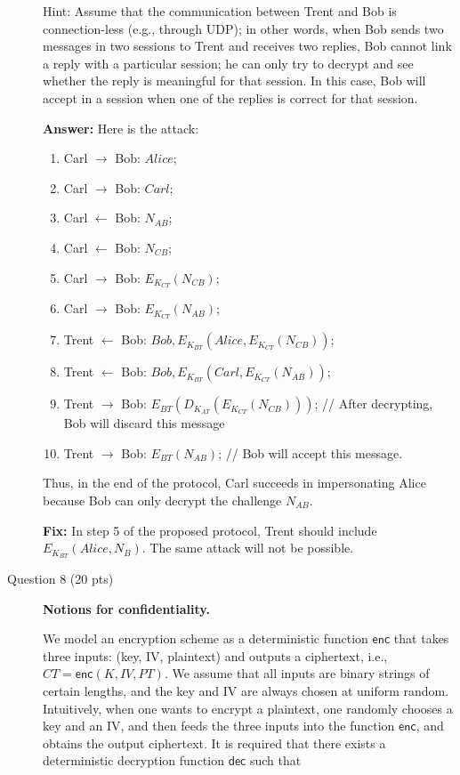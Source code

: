 \documentclass[11pt]{article}
\newcommand{\ans}[1]{\begin{mdframed}\textbf{Answer: }#1\end{mdframed}}
\begin{document}
\begin{description}
Hint: Assume that the communication between Trent and Bob is
connection-less (e.g., through UDP); in other words, when Bob sends two
messages in two sessions to Trent and receives two replies, Bob cannot
link a reply with a particular session; he can only try to decrypt and
see whether the reply is meaningful for that session.  In this case, Bob
will accept in a session when one of the replies is correct for that
session.\\
\ans{ Here is the attack:
    \begin{enumerate}
       \item Carl $\rightarrow$ Bob: $Alice$;
       \item Carl $\rightarrow$ Bob: $Carl$;
       \item Carl $\leftarrow$ Bob: $N_{AB}$;
       \item Carl $\leftarrow$ Bob: $N_{CB}$;
       \item Carl $\rightarrow$ Bob: $E_{K_{CT}}(N_{CB})$;
       \item Carl $\rightarrow$ Bob: $E_{K_{CT}}(N_{AB})$;
       \item Trent $\leftarrow$ Bob: $Bob,E_{K_{BT}}(Alice, E_{K_{CT}}(N_{CB}))$;
       \item Trent $\leftarrow$ Bob: $Bob,E_{K_{BT}}(Carl, E_{K_{CT}}(N_{AB}))$;
       \item Trent $\rightarrow$ Bob: $E_{BT}(D_{K_{AT}}(E_{K_{CT}}(N_{CB})))$;  // After decrypting, Bob will discard this message
       \item Trent $\rightarrow$ Bob: $E_{BT}(N_{AB})$; // Bob will accept this message.
     \end{enumerate} 
     Thus, in the end of the protocol, Carl succeeds in impersonating Alice because Bob can only decrypt the challenge $N_{AB}$.

     \textbf{Fix:} In step 5 of the proposed protocol, Trent should include $E_{K_{BT}}(Alice, N_B)$. The same attack will not be possible.     
}



 \item[Question 8 (20 pts)]  \textbf{Notions for confidentiality.} 

We model an encryption scheme as a deterministic function $\mathsf{enc}$ that takes three inputs: (key, IV, plaintext) and outputs a ciphertext, i.e., $CT=\mathsf{enc}(K,IV,PT)$.  We assume that all inputs are binary strings of certain lengths, and the key and IV are always chosen at uniform random.  Intuitively, when one wants to encrypt a plaintext, one randomly chooses a key and an IV, and then feeds the three inputs into the function $\mathsf{enc}$, and obtains the output ciphertext.  It is required that there exists a deterministic decryption function
$\mathsf{dec}$ such that


\end{description}
\end{document}
